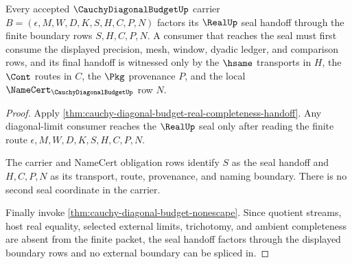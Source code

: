 \begin{theorem}
\label{thm:cauchy-diagonal-budget-seal-boundary-factorization}
Every accepted $\CauchyDiagonalBudgetUp$ carrier $B=(\epsilon,M,W,D,K,S,H,C,P,N)$ factors its $\RealUp$ seal handoff through the finite boundary rows $S,H,C,P,N$. A consumer that reaches the seal must first consume the displayed precision, mesh, window, dyadic ledger, and comparison rows, and its final handoff is witnessed only by the $\hsame$ transports in $H$, the $\Cont$ routes in $C$, the $\Pkg$ provenance $P$, and the local $\NameCert_{\CauchyDiagonalBudgetUp}$ row $N$.
\end{theorem}
\begin{proof}
Apply \autoref{thm:cauchy-diagonal-budget-real-completeness-handoff}. Any diagonal-limit consumer reaches the $\RealUp$ seal only after reading the finite route $\epsilon,M,W,D,K,S,H,C,P,N$.

The carrier and NameCert obligation rows identify $S$ as the seal handoff and $H,C,P,N$ as its transport, route, provenance, and naming boundary. There is no second seal coordinate in the carrier.

Finally invoke \autoref{thm:cauchy-diagonal-budget-nonescape}. Since quotient streams, host real equality, selected external limits, trichotomy, and ambient completeness are absent from the finite packet, the seal handoff factors through the displayed boundary rows and no external boundary can be spliced in.
\end{proof}

